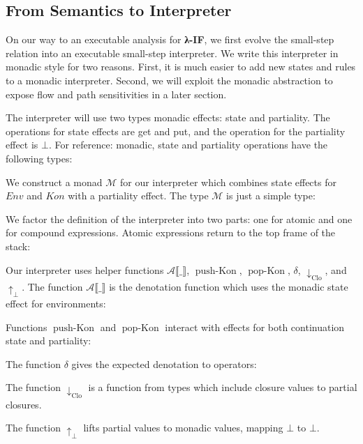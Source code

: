 \documentclass[pldi]{sigplanconf}
\makeatletter
\newcommand{\lamif}{\textbf{λ-IF}\@}
\newcommand{\pushkon}{\operatorname{push-Kon}}
\newcommand{\popkon}{\operatorname{pop-Kon}}
\newcommand{\coerce}[1]{\operatorname{↓_{#1}}}
\newcommand{\failonbot}{\operatorname{↑_⊥}}
\makeatother
\begin{document}

\subsection{From Semantics to Interpreter}
\label{interpreter}

On our way to an executable analysis for \lamif, we first evolve the small-step relation into an executable small-step interpreter.
We write this interpreter in monadic style for two reasons.
First, it is much easier to add new states and rules to a monadic interpreter.
Second, we will exploit the monadic abstraction to expose flow and path sensitivities in a later section.

The interpreter will use two types monadic effects: state and partiality.
The operations for state effects are get and put, and the operation for the partiality effect is $⊥$.
For reference: monadic, state and partiality operations have the following types:


%
%

We construct a monad $ℳ $ for our interpreter which combines state effects for $Env$ and $Kon$ with a partiality effect.
The type $ℳ $ is just a simple type:


We factor the definition of the interpreter into two parts: one for atomic and one for compound expressions.
Atomic expressions return to the top frame of the stack:


Our interpreter uses helper functions $𝒜 ⟦\_⟧$, $\pushkon$, $\popkon$, $\delta$, $\coerce{Clo}$, and $\failonbot$.
The function $𝒜 ⟦\_⟧$ is the denotation function which uses the monadic state effect for environments:


Functions $\pushkon$ and $\popkon$ interact with effects for both continuation state and partiality:


The function $\delta$ gives the expected denotation to operators:


The function $\coerce{Clo}$ is a function from types which include closure values to partial closures.


The function $\failonbot$ lifts partial values to monadic values, mapping $⊥$ to $⊥$.

\end{document}
